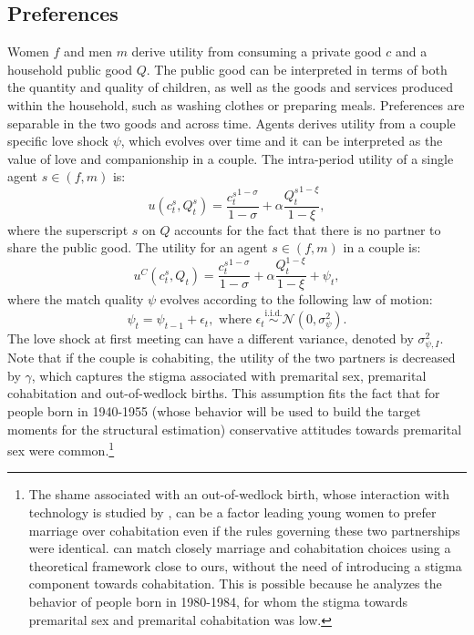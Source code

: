\documentclass[12pt]{article}
\numberwithin{table}{section}
\begin{document}
\subsection{Preferences}
Women $f$ and men $m$ derive utility from consuming a private good  $c$ and a household public good $Q$. The public good can be interpreted in terms of both the quantity and quality of children, as well as the goods and services produced within the household, such as washing clothes or preparing meals. Preferences are separable in the two goods and across time.
Agents derives utility from a couple specific love shock $\psi$, which evolves over time and it can be interpreted as the value of love and companionship in a couple. The intra-period utility of a single agent $s\in(f,m)$ is:
\[u(c^s_t,Q^s_t)=\frac{{c^s_t}^{1-\sigma}}{1-\sigma}+\alpha\frac{{Q^s_t}^{1-\xi}}{1-\xi},\]
where the superscript $s$ on $Q$ accounts for the fact that there is no partner to share the public good. The utility for an agent $s\in(f,m)$ in a couple is:
\[u^{C}(c^s_t,Q_t)=\frac{{c_t^s}^{1-\sigma}}{1-\sigma}+\alpha\frac{Q_t^{1-\xi}}{1-\xi}+\psi_t,\]
where the match quality $\psi$ evolves according to the following law of motion:
\[\psi_t=\psi_{t-1}+\epsilon_t,\text{ where }\epsilon_t \overset{\text{i.i.d.}}{\sim}\mathcal{N}(0,\sigma^2_{\psi}). \]
The love shock at first meeting can have a different variance, denoted by $\sigma^2_{\psi,I}$. Note that if the couple is cohabiting, the utility of the two partners is decreased by $\gamma$, which captures the stigma associated with premarital sex, premarital cohabitation and out-of-wedlock births. This assumption fits the fact that for people born in 1940-1955 (whose behavior will be used to build the target moments for the structural estimation) conservative attitudes towards premarital sex were common.\footnote{The shame associated with an out-of-wedlock birth, whose interaction with technology is studied by \cite{fernandez2014}, can be a factor leading young women to prefer marriage over cohabitation even if the rules governing these two partnerships were identical. \cite{blasutto2020} can match closely marriage and cohabitation choices using a theoretical framework close to ours, without the need of introducing a stigma component towards cohabitation. This is possible because he analyzes the behavior of people born in 1980-1984, for whom the stigma towards premarital sex and premarital cohabitation was low.}
\end{document}
